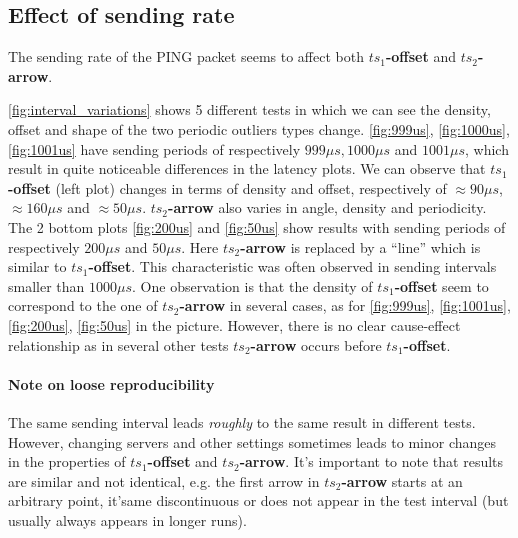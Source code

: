 \documentclass{article}
\begin{document}
\subsection{Effect of sending rate}
\label{sec:sending_rate}

The sending rate of the PING packet seems to affect both \textbf{$ts_1$-offset} 
and \textbf{$ts_2$-arrow}. 

\autoref{fig:interval_variations} shows 5 different 
tests in which we can see the density, offset and shape of the two periodic 
outliers types change. \autoref{fig:999us}, \autoref{fig:1000us}, 
\autoref{fig:1001us} have sending periods of respectively $999\mu s, 1000\mu s$
and $1001\mu s$, which result in quite noticeable differences in the latency
plots. We can observe that \textbf{$ts_1$-offset} (left plot) changes in terms
of density and offset, respectively of $\approx90\mu s$, $\approx160\mu s$ 
and $\approx50\mu s$. \textbf{$ts_2$-arrow} also varies in angle, density and 
periodicity. The 2 bottom plots \autoref{fig:200us} and \autoref{fig:50us} show 
results with sending periods of respectively $200\mu s$ and $50\mu s$. Here 
\textbf{$ts_2$-arrow} is replaced by a ``line'' which is similar to 
\textbf{$ts_1$-offset}. This characteristic was often observed in sending intervals
smaller than $1000\mu s$. One observation is that the density of 
\textbf{$ts_1$-offset} seem to correspond to the one of 
\textbf{$ts_2$-arrow} in several cases, as for \autoref{fig:999us}, 
\autoref{fig:1001us}, \autoref{fig:200us}, \autoref{fig:50us} in the picture.
However, there is no clear cause-effect relationship as in several other tests 
\textbf{$ts_2$-arrow} occurs before \textbf{$ts_1$-offset}. 

\paragraph*{Note on loose reproducibility} 
The same sending interval leads \textit{roughly} to the same result in different
tests. However, changing servers and other settings sometimes leads to minor 
changes in the properties of \textbf{$ts_1$-offset} and \textbf{$ts_2$-arrow}.
It's important to note that results are similar and not identical, e.g.
the first arrow in \textbf{$ts_2$-arrow} starts at an arbitrary point, it'same
discontinuous or does not appear in the test interval (but usually always 
appears in longer runs).
\end{document}
